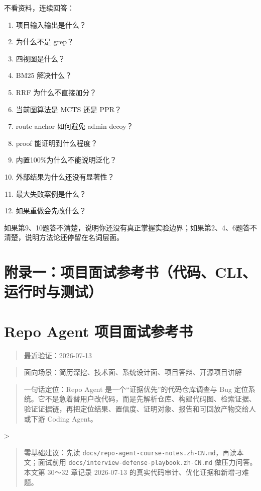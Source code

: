 \documentclass[UTF8,12pt,openany]{ctexbook}
\begin{document}
不看资料，连续回答：\par

\begin{enumerate}
\item 项目输入输出是什么？
\item 为什么不是 grep？
\item 四视图是什么？
\item BM25 解决什么？
\item RRF 为什么不直接加分？
\item 当前图算法是 MCTS 还是 PPR？
\item route anchor 如何避免 admin decoy？
\item proof 能证明到什么程度？
\item 内置100\%为什么不能说明泛化？
\item 外部结果为什么还没有显著性？
\item 最大失败案例是什么？
\item 如果重做会先改什么？
\end{enumerate}

如果第9、10题答不清楚，说明你还没有真正掌握实验边界；如果第2、4、6题答不清楚，说明方法论还停留在名词层面。\par


\clearpage
\chapter{附录一：项目面试参考书（代码、CLI、运行时与测试）}

\clearpage
\chapter{Repo Agent 项目面试参考书}

\begin{quote}
最近验证：2026-07-13
\end{quote}
\begin{quote}
面向场景：简历深挖、技术面、系统设计面、项目答辩、开源项目讲解
\end{quote}
\begin{quote}
一句话定位：Repo Agent 是一个“证据优先”的代码仓库调查与 Bug 定位系统。它不是急着替用户改代码，而是先解析仓库、构建代码图、检索证据、验证证据链，再把定位结果、置信度、证明对象、报告和可回放产物交给人或下游 Coding Agent。
\end{quote}
>\par
\begin{quote}
零基础建议：先读 \texttt{docs/repo-agent-course-notes.zh-CN.md}，再读本文；面试前用 \texttt{docs/interview-defense-playbook.zh-CN.md} 做压力问答。本文第 30～32 章记录 2026-07-13 的真实代码审计、优化证据和新增刁难题。
\end{quote}
\end{document}
